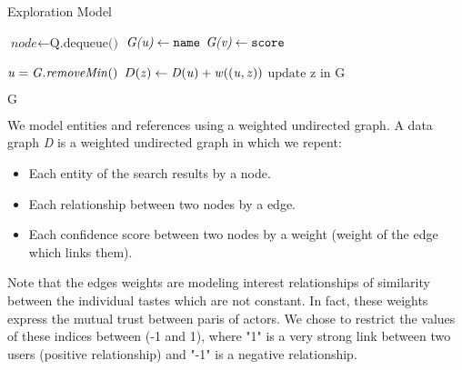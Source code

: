 \begin{algorithm}
\caption{Exploration Model}\label{graph}
\begin{algorithmic}[2]
		\State $\textit{node} \gets \text{Q.dequeue()}$
		\State $\textit{G(\it{u})} \gets \texttt{name}$
		\State $\textit{G(\it{v})} \gets \texttt{score}$
	\EndIf
\EndWhile\label{euclidendwhile}

	\State $\it{u} = G.removeMin()$
			\State $D(\it{z}) \gets D(\it{u}) + w((\it{u, z}))$
			\State $\text{update z in G}$
		\EndIf
	\EndFor
\EndWhile

\Return $\text{G}$
\EndProcedure
\end{algorithmic}
\end{algorithm}



We model entities and references using a weighted undirected graph. A data graph {\it D} is a weighted undirected graph in which we repent:
\begin{itemize}
	\item Each entity of the search results by a node.
	\item Each relationship between two nodes by a edge.
	\item Each confidence score between two nodes by a weight (weight of the edge which links them).
\end{itemize}

Note that the edges weights are modeling interest relationships of similarity between the individual tastes which are not constant. In fact, these weights express the mutual trust between paris of actors. We chose to restrict the values of these indices between (-1 and 1), where "1" is a very strong link between two users (positive relationship) and "-1" is a negative relationship.
